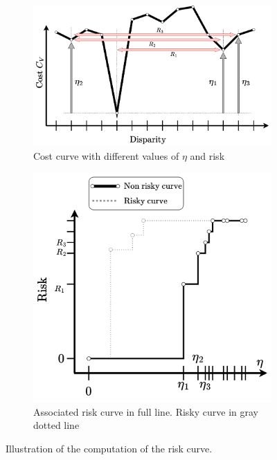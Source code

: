 \begin{figure}
    \centering
    \begin{subfigure}[t]{0.6\linewidth}
        \centering
        \includegraphics[width=\linewidth]{Images/Chap_1/Integral_Risk_1.png}
        \caption{Cost curve with different values of $\eta$ and risk}
        \label{fig:integral_risk_1}
    \end{subfigure}\hfill
    \begin{subfigure}[t]{0.4\linewidth}
        \centering
        \includegraphics[width=\linewidth]{Images/Chap_1/Integral_Risk_2.png}
        \caption{Associated risk curve in full line. Risky curve in gray dotted line}
        \label{fig:integral_risk_2}
    \end{subfigure}\hfill
    \caption{Illustration of the computation of the risk curve.}
    \label{fig:integral_risk}
\end{figure}


\pagebreak
\blankpage